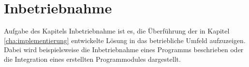 \chapter{Inbetriebnahme}
\label{cha:inbetriebnahme}

Aufgabe des Kapitels Inbetriebnahme ist es, die Überführung der in 
Kapitel \ref{cha:implementierung} entwickelte Lösung in das betriebliche 
Umfeld aufzuzeigen. Dabei wird beispielsweise die Inbetriebnahme eines 
Programms beschrieben oder die Integration eines erstellten 
Programmodules dargestellt.

